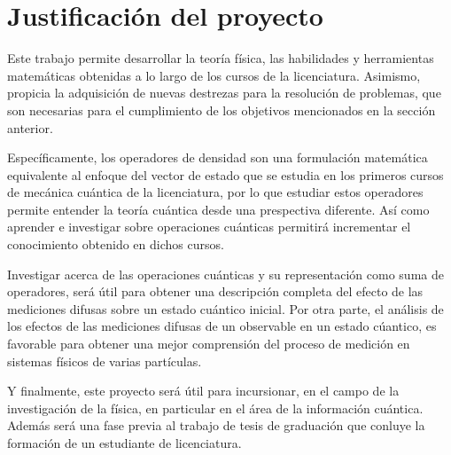 \section{Justificación del proyecto}

	  Este trabajo permite desarrollar la teoría física, las habilidades y herramientas matemáticas obtenidas a lo largo de los cursos de la licenciatura. Asimismo, propicia la adquisición de nuevas destrezas para la resolución de problemas, que son necesarias para el cumplimiento de los objetivos mencionados en la sección anterior. 
	  
	  Específicamente, los operadores de densidad son una formulación matemática equivalente al enfoque del vector de estado que se estudia en los primeros cursos de mecánica cuántica de la licenciatura, por lo que estudiar estos operadores permite entender la teoría cuántica desde una prespectiva diferente. Así como aprender e investigar sobre operaciones cuánticas permitirá incrementar el conocimiento obtenido en dichos cursos.
	  


Investigar acerca de las operaciones cuánticas y su representación como suma de operadores, será útil para obtener una descripción completa del efecto de las mediciones difusas sobre un estado cuántico inicial. Por otra parte, el análisis de los efectos de las mediciones difusas de un observable en un estado cúantico, es favorable para obtener una mejor comprensión del proceso de medición en sistemas físicos de varias partículas.

 
  
  
 
  
 Y finalmente, este proyecto será útil para incursionar, en el campo de la investigación de la física, en particular en el área de la información cuántica. Además será una fase previa al trabajo de tesis de graduación que conluye la formación de un estudiante de licenciatura.    
